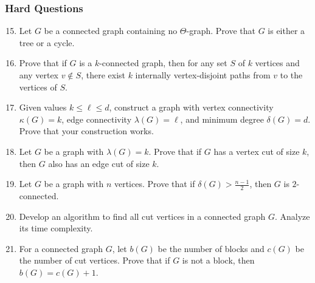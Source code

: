 \documentclass{article}
\theoremstyle{definition}
\begin{document}
\subsubsection{Hard Questions}
\begin{enumerate}\setcounter{enumi}{14}
\item Let $G$ be a connected graph containing no $\Theta$-graph. Prove that $G$ is either a tree or a cycle.

\item Prove that if $G$ is a $k$-connected graph, then for any set $S$ of $k$ vertices and any vertex $v \not\in S$, there exist $k$ internally vertex-disjoint paths from $v$ to the vertices of $S$.

\item Given values $k \leq \ell \leq d$, construct a graph with vertex connectivity $\kappa(G) = k$, edge connectivity $\lambda(G) = \ell$, and minimum degree $\delta(G) = d$. Prove that your construction works.

\item Let $G$ be a graph with $\lambda(G) = k$. Prove that if $G$ has a vertex cut of size $k$, then $G$ also has an edge cut of size $k$.

\item Let $G$ be a graph with $n$ vertices. Prove that if $\delta(G) > \frac{n-1}{2}$, then $G$ is $2$-connected.

\item Develop an algorithm to find all cut vertices in a connected graph $G$. Analyze its time complexity.

\item For a connected graph $G$, let $b(G)$ be the number of blocks and $c(G)$ be the number of cut vertices. Prove that if $G$ is not a block, then $b(G) = c(G) + 1$.
\end{enumerate}
\end{document}
